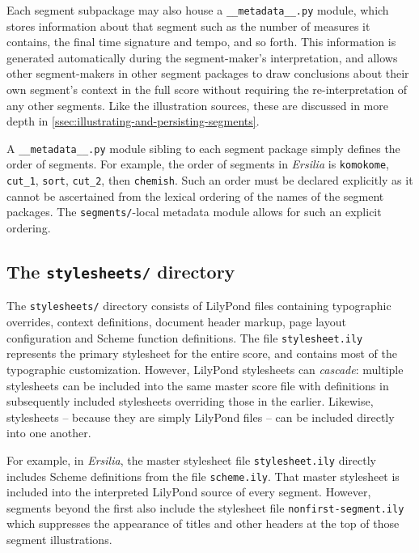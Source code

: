 Each segment subpackage may also house a \texttt{\_\_metadata\_\_.py}
module, which stores information about that segment such as the number of
measures it contains, the final time signature and tempo, and so forth. This
information is generated automatically during the segment-maker's
interpretation, and allows other segment-makers in other segment packages to
draw conclusions about their own segment's context in the full score without
requiring the re-interpretation of any other segments. Like the illustration
sources, these are discussed in more depth in
\autoref{ssec:illustrating-and-persisting-segments}.

A \texttt{\_\_metadata\_\_.py} module sibling to each segment package simply
defines the order of segments. For example, the order of segments in
\emph{Ersilia} is \texttt{komokome}, \texttt{cut\_1}, \texttt{sort},
\texttt{cut\_2}, then \texttt{chemish}. Such an order must be declared
explicitly as it cannot be ascertained from the lexical ordering of the names
of the segment packages. The \texttt{segments/}-local metadata module allows
for such an explicit ordering.

\subsection{The \texttt{stylesheets/} directory}
\label{ssec:the-stylesheets-directory}

The \texttt{stylesheets/} directory consists of LilyPond files containing
typographic overrides, context definitions, document header markup, page layout
configuration and Scheme function definitions. The file \texttt{stylesheet.ily}
represents the primary stylesheet for the entire score, and contains most of
the typographic customization. However, LilyPond stylesheets can
\emph{cascade}: multiple stylesheets can be included into the same master score
file with definitions in subsequently included stylesheets overriding those in
the earlier. Likewise, stylesheets -- because they are simply LilyPond files --
can be included directly into one another.

For example, in \emph{Ersilia}, the master stylesheet file
\texttt{stylesheet.ily} directly includes Scheme definitions from the
file \texttt{scheme.ily}. That master stylesheet is included into the
interpreted LilyPond source of every segment. However, segments beyond the
first also include the stylesheet file \texttt{nonfirst-segment.ily} which
suppresses the appearance of titles and other headers at the top of those
segment illustrations.

